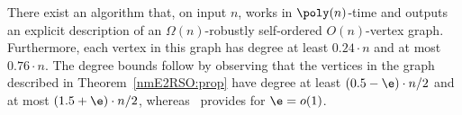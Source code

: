 \label{dense-rso1:thm}
There exist an algorithm that, on input $n$,
works in $\poly(n)$-time and outputs an explicit description of
an $\Omega(n)$-robustly self-ordered $O(n)$-vertex graph.
Furthermore, each vertex in this graph has degree
at least $0.24\cdot n$ and at most $0.76\cdot n$.
\ET
The degree bounds follow by observing that the vertices
in the graph described in Theorem~\ref{nmE2RSO:prop}
have degree at least $(0.5-\e)\cdot n/2$
and at most $(1.5+\e)\cdot n/2$,
whereas~\cite[Thm.~1]{CGL} provides for $\e=o(1)$.



















































































































